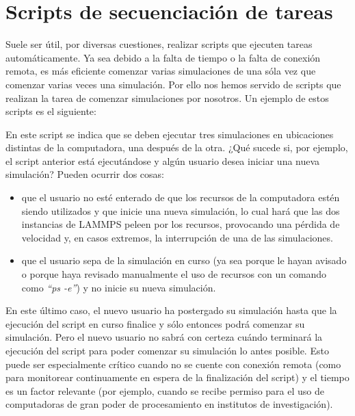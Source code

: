 \label{AD} %


\section{Scripts de secuenciación de tareas}
\label{AD_Sec}

Suele ser útil, por diversas cuestiones, realizar scripts que ejecuten tareas automáticamente. Ya sea debido a la falta de tiempo o la falta de conexión remota, es más eficiente comenzar varias simulaciones de una sóla vez que comenzar varias veces una simulación. Por ello nos hemos servido de scripts que realizan la tarea de comenzar simulaciones por nosotros. Un ejemplo de estos scripts es el siguiente:



En este script se indica que se deben ejecutar tres simulaciones en ubicaciones distintas de la computadora, una después de la otra. ¿Qué sucede si, por ejemplo, el script anterior está ejecutándose y algún usuario desea iniciar una nueva simulación? Pueden ocurrir dos cosas:

\begin{itemize}
 \item que el usuario no esté enterado de que los recursos de la computadora estén siendo utilizados y que inicie una nueva simulación, lo cual hará que las dos instancias de LAMMPS peleen por los recursos, provocando una pérdida de velocidad y, en casos extremos, la interrupción de una de las simulaciones.
 \item que el usuario sepa de la simulación en curso (ya sea porque le hayan avisado o porque haya revisado manualmente el uso de recursos con un comando como \textit{``ps -e''}) y no inicie su nueva simulación.
\end{itemize}

En este último caso, el nuevo usuario ha postergado su simulación hasta que la ejecución del script en curso finalice y sólo entonces podrá comenzar su simulación. Pero el nuevo usuario no sabrá con certeza cuándo terminará la ejecución del script para poder comenzar su simulación lo antes posible. Esto puede ser especialmente crítico cuando no se cuente con conexión remota (como para monitorear continuamente en espera de la finalización del script) y el tiempo es un factor relevante (por ejemplo, cuando se recibe permiso para el uso de computadoras de gran poder de procesamiento en institutos de investigación).

